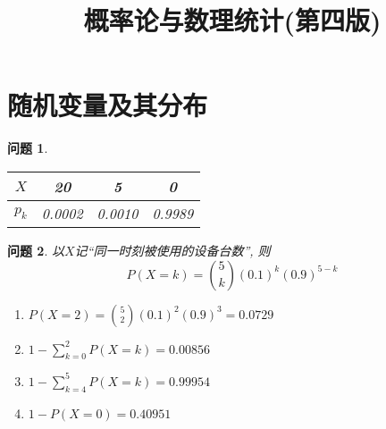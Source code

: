 \documentclass[a4paper]{article}
\theoremstyle{mystyle}
\newtheorem{prob}{问题}[section]
\begin{document}
	\title{\huge \bf 概率论与数理统计(第四版)}
	\maketitle
	\setcounter{section}{1}
	\section{随机变量及其分布}
	\begin{prob}
		\begin{tabular}{c|ccc}
		$X$ & 20 & 5 & 0\\
		\hline
		$p_k$ & 0.0002 & 0.0010 & 0.9989
		\end{tabular}
	\end{prob}
	\setcounter{prob}{5}
	\begin{prob}
		以$X$记``同一时刻被使用的设备台数'', 则
		\[
			P(X=k)={5\choose k}(0.1)^k(0.9)^{5-k}
		\]
		\begin{enumerate}[{(}1{)}]
			\item
			$\displaystyle P(X=2)={5\choose 2}(0.1)^2(0.9)^{3}=0.0729$
			\item
			$\displaystyle 1-\sum_{k=0}^2P(X=k)=0.00856$
			\item
			$\displaystyle 1-\sum_{k=4}^5 P(X=k)=0.99954$
			\item
			$\displaystyle 1-P(X=0)=0.40951$
		\end{enumerate}
	\end{prob}
\end{document}
